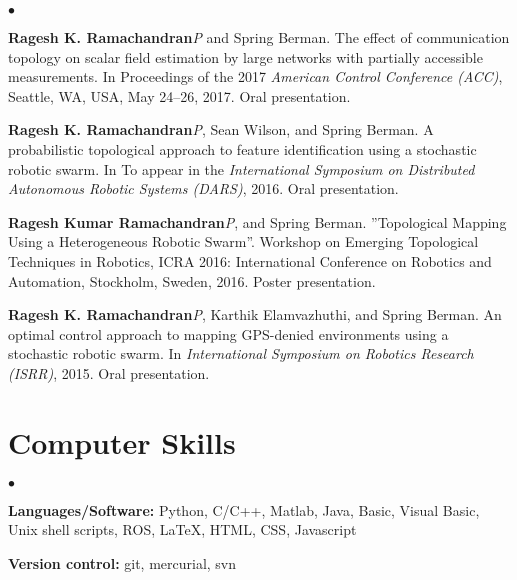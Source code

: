 \documentclass[margin,line]{res}
\newenvironment{list2}{
  \begin{list}{$\bullet$}{%
      \setlength{\itemsep}{0in}
      \setlength{\parsep}{0in} \setlength{\parskip}{0in}
      \setlength{\topsep}{0in} \setlength{\partopsep}{0in} 
      \setlength{\leftmargin}{0.2in}}}{\end{list}}
\begin{document}
\begin{resume}
\begin{list2}
	\item \textbf{Ragesh K. Ramachandran}\textit{P} and Spring Berman. The effect of communication topology on scalar field estimation by large networks with partially accessible measurements. In Proceedings of the 2017\textit{ American Control Conference (ACC)}, Seattle, WA, USA, May 24–26, 2017. Oral presentation.
	\item \textbf{Ragesh K. Ramachandran}\textit{P}, Sean Wilson, and Spring Berman. A probabilistic topological approach to feature identification using a stochastic robotic swarm. In To appear in the \textit{International Symposium on Distributed Autonomous Robotic Systems (DARS)}, 2016. Oral presentation.
	\item \textbf{Ragesh Kumar Ramachandran}\textit{P}, and Spring Berman. ''Topological Mapping Using a Heterogeneous Robotic Swarm''. Workshop on Emerging Topological Techniques in Robotics, ICRA 2016: International Conference on Robotics and Automation, Stockholm, Sweden, 2016.  Poster presentation.
	\item \textbf{Ragesh K. Ramachandran}\textit{P}, Karthik Elamvazhuthi, and Spring Berman. An optimal control approach to mapping GPS-denied environments using a stochastic robotic swarm. In \textit{International Symposium on Robotics Research (ISRR)}, 2015. Oral presentation.
\end{list2}



\section{\sc Computer Skills} 
\begin{list2}
\item \textbf{Languages/Software:} Python, C/C++, Matlab, Java, Basic, Visual Basic, Unix shell scripts, ROS, \LaTeX, HTML, CSS, Javascript
\item \textbf{Version control:} git, mercurial, svn
\end{list2}


\end{resume}
\end{document}
